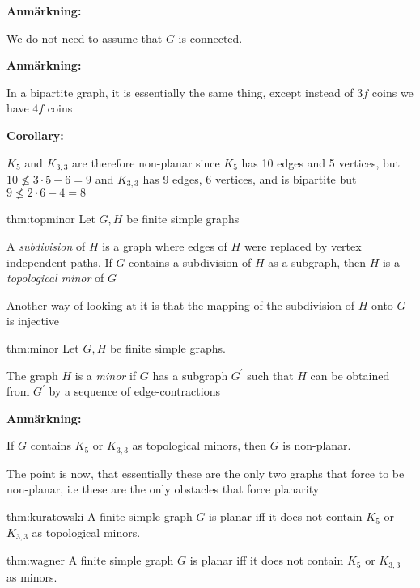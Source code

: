 \par\bigskip
\noindent\textbf{Anmärkning:}\par
\noindent We do not need to assume that $G$ is connected.
\par\bigskip
\noindent\textbf{Anmärkning:}\par
\noindent In a bipartite graph, it is essentially the same thing, except instead of $3f$ coins we have $4f$ coins
\par\bigskip
\noindent\textbf{Corollary:}\par
\noindent $K_5$ and $K_{3,3}$ are therefore non-planar since $K_5$ has 10 edges and 5 vertices, but $10\not\leq 3\cdot5 -6 = 9$ and $K_{3,3}$ has 9 edges, 6 vertices, and is bipartite but $9\not\leq 2\cdot6-4 = 8$
\newpage
\begin{theo}{thm:topminor}
  Let $G,H$ be finite simple graphs
  \par\bigskip
  \noindent A \textit{subdivision} of $H$ is a graph where edges of $H$ were replaced by vertex independent paths. If $G$ contains a subdivision of $H$ as a subgraph, then $H$ is a \textit{topological minor} of $G$
  \par\bigskip
  \noindent Another way of looking at it is that the mapping of the subdivision of $H$ onto $G$ is injective
\end{theo}
\par\bigskip
\begin{theo}[Minor]{thm:minor}
  Let $G,H$ be finite simple graphs.
  \par\bigskip
  \noindent The graph $H$ is a \textit{minor} if $G$ has a subgraph $G^{\prime}$ such that $H$ can be obtained from $G^{\prime}$ by a sequence of edge-contractions
\end{theo}
\par\bigskip
\noindent\textbf{Anmärkning:}\par
\noindent If $G$ contains $K_5$ or $K_{3,3}$ as topological minors, then $G$ is non-planar.
\par\bigskip
\noindent The point is now, that essentially these are the only two graphs that force to be non-planar, i.e these are the only obstacles that force planarity
\par\bigskip
\begin{theo}[Kuratowski]{thm:kuratowski}
  A finite simple graph $G$ is planar iff it does not contain $K_5$ or $K_{3,3}$ as topological minors.
\end{theo}
\par\bigskip
\begin{theo}[Wagner]{thm:wagner}
  A finite simple graph $G$ is planar iff it does not contain $K_5$ or $K_{3,3}$ as minors.
\end{theo}
